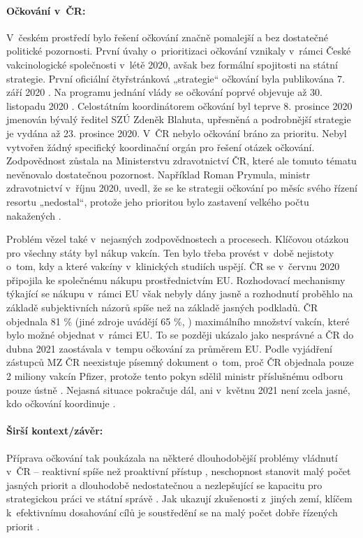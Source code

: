 \paragraph{Očkování v~ČR:} V~českém prostředí bylo řešení očkování značně pomalejší a bez dostatečné politické pozornosti. První úvahy o~prioritizaci očkování vznikaly v~rámci České vakcinologické společnosti v~létě 2020, avšak bez formální spojitosti na státní strategie. První oficiální čtyřstránková „strategie“ očkování byla publikována 7. září 2020 \cite{mz2021strat}. Na programu jednání vlády se očkování poprvé objevuje až 30. listopadu 2020 \cite{vlada_prijala_2020}. Celostátním koordinátorem očkování byl teprve 8. prosince 2020 jmenován bývalý ředitel SZÚ Zdeněk Blahuta, upřesněná a podrobnější strategie je vydána až 23. prosince 2020. V~ČR nebylo očkování bráno za prioritu. Nebyl vytvořen žádný specifický koordinační orgán pro řešení otázek očkování. Zodpovědnost zůstala na Ministerstvu zdravotnictví ČR, které ale tomuto tématu nevěnovalo dostatečnou pozornost. Například Roman Prymula, ministr zdravotnictví v~říjnu 2020, uvedl, že se ke strategii očkování po měsíc svého řízení resortu „nedostal“, protože jeho prioritou bylo zastavení velkého počtu nakažených \cite{pokorna_startuje_2020}.

Problém vězel také v~nejasných zodpovědnostech a procesech. Klíčovou otázkou pro všechny státy byl nákup vakcín. Ten bylo třeba provést v~době nejistoty o~tom, kdy a které vakcíny v~klinických studiích uspějí. ČR se v~červnu 2020 připojila ke společnému nákupu prostřednictvím EU. Rozhodovací mechanismy týkající se nákupu v~rámci EU však nebyly dány jasně a rozhodnutí proběhlo na základě subjektivních názorů spíše než na základě jasných podkladů. ČR objednala 81 \% \cite{houska_cesko_2021} (jiné zdroje uvádějí 65 \%, \cite{koubsky_slozite_2021}) maximálního množství vakcín, které bylo možné objednat v~rámci EU. To se později ukázalo jako nesprávné a ČR do dubna 2021 zaostávala v~tempu očkování za průměrem EU. Podle vyjádření zástupců MZ ČR neexistuje písemný dokument o~tom, proč ČR objednala pouze 2 miliony vakcín Pfizer, protože tento pokyn sdělil ministr příslušnému odboru pouze ústně \cite{pokorna_proc_2021} . Nejasná situace pokračuje dál, ani v~květnu 2021 není zcela jasné, kdo očkování koordinuje \cite{televize_nevime_2021, skoupa_je_2021}.

\paragraph{Širší kontext/závěr:} Příprava očkování tak poukázala na některé dlouhodobější problémy vládnutí v~ČR -- reaktivní spíše než proaktivní přístup \cite{hlidac_statu_nejvetsi_2020}, neschopnost stanovit malý počet jasných priorit \cite{sedlackova_stat_2020} a dlouhodobě nedostatečnou a nezlepšující se kapacitu pro strategickou práci ve státní správě \cite{ministerstvo_pro_mistni_rozvoj_cr_ministerstvo_2020} . Jak ukazují zkušenosti z~jiných zemí, klíčem k~efektivnímu dosahování cílů je soustředění se na malý počet dobře řízených priorit \cite{allas_delivering_2018, department_of_the_prime_minister_and_cabinet_our_2019, european_social_fund_public_2020}.


